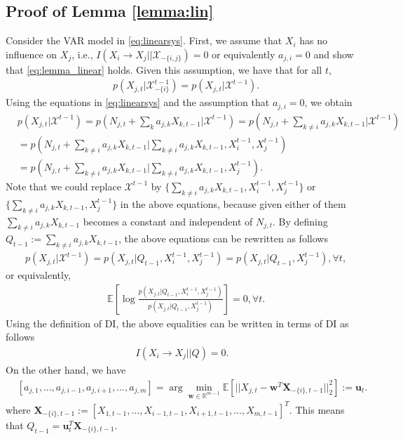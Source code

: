\subsection{Proof of Lemma \ref{lemma:lin}}
Consider the VAR model in \eqref{eq:linearsys}. 
First, we assume that $X_i$ has no influence on $X_j$, i.e., $I(X_i\rightarrow X_j||\mathcal{X}_{-\{i,j\}})=0$ or equivalently $a_{j,i}=0$ and show that \eqref{eq:lemma_linear} holds. Given this assumption, we have that for all $t$,
\begin{align*}
    &p(X_{j,t}|\mathcal{X}_{-\{i\}}^{t-1})=p(X_{j,t}|\mathcal{X}^{t-1}).
\end{align*}
Using the equations in \eqref{eq:linearsys} and the assumption that $a_{j,i}=0$, we obtain
\begin{align*}
    &p(X_{j,t}|\mathcal{X}^{t-1})= p(N_{j,t}+\sum_{k}a_{j,k}X_{k,t-1}|\mathcal{X}^{t-1})=p(N_{j,t}+\sum_{k\neq i}a_{j,k}X_{k,t-1}|\mathcal{X}^{t-1})\\ 
    &=p(N_{j,t}+\sum_{k\neq i}a_{j,k}X_{k,t-1}|\sum_{k\neq i}a_{j,k}X_{k,t-1},{X}_{i}^{t-1},{X}_{j}^{t-1})\\
    &=p(N_{j,t}+\sum_{k\neq i}a_{j,k}X_{k,t-1}|\sum_{k\neq i}a_{j,k}X_{k,t-1},{X}_{j}^{t-1}).
\end{align*}
Note that we could replace $\mathcal{X}^{t-1}$ by $\{\sum_{k\neq i}a_{j,k}X_{k,t-1},{X}_{i}^{t-1},{X}_{j}^{t-1}\}$ or\\
$\{\sum_{k\neq i}a_{j,k}X_{k,t-1},{X}_{j}^{t-1}\}$ in the above equations, because given either of them $\sum_{k\neq i}a_{j,k}X_{k,t-1}$ becomes a constant and independent of $N_{j,t}$.
By defining $Q_{t-1}:=\sum_{k\neq i}a_{j,k}X_{k,t-1}$, the above equations can be rewritten as follows 
\begin{align*}
    &p(X_{j,t}|\mathcal{X}^{t-1})=p(X_{j,t}|Q_{t-1},{X}_{i}^{t-1},{X}_{j}^{t-1})=p(X_{j,t}|Q_{t-1},{X}_{j}^{t-1}), \forall t,
\end{align*}
or equivalently, 
\begin{align*}
    &\mathbb{E}\left[\log\frac{p(X_{j,t}|Q_{t-1},{X}_{i}^{t-1},{X}_{j}^{t-1})}{p(X_{j,t}|Q_{t-1},{X}_{j}^{t-1})}\right]=0, \forall t.
\end{align*}
Using the definition of DI, the above equalities can be written in terms of DI as follows
\begin{align*}
   I(X_i\rightarrow X_j||Q)=0.
\end{align*}
On the other hand, we have 
\begin{align*}
&[a_{j,1},...,a_{j,i-1},a_{j,i+1},...,a_{j,m}]=\arg\min_{\textbf{w}\in\mathbb{R}^{m-1}}\mathbb{E}\left[||X_{j,t}- \textbf{w}^T \textbf{X}_{-\{i\},t-1}||_2^2\right]:=\textbf{u}_t.
\end{align*}
where $\textbf{X}_{-\{i\},t-1} :=[X_{1,t-1},..., X_{i-1,t-1}, X_{i+1,t-1},..., X_{m,t-1} ]^T$. This means that $Q_{t-1}=\textbf{u}_t^T\textbf{X}_{-\{i\},t-1}$.

